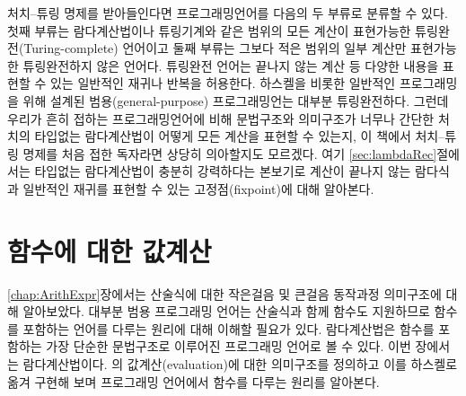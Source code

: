 처치--튜링 명제를 받아들인다면 프로그래밍언어를 다음의 두 부류로 분류할 수 있다.
첫째 부류는 람다계산법이나 튜링기계와 같은 범위의 모든 계산이 표현가능한 
튜링완전(Turing-complete) 언어이고 둘째 부류는 그보다 적은 범위의 일부 계산만
표현가능한 튜링완전하지 않은 언어다. 튜링완전 언어는 끝나지 않는 계산 등
다양한 내용을 표현할 수 있는 일반적인 재귀나 반복을 허용한다. 하스켈을 비롯한
일반적인 프로그래밍을 위해 설계된 범용(general-purpose) 프로그래밍언는 대부분
튜링완전하다. 그런데 우리가 흔히 접하는 프로그래밍언어에 비해 문법구조와
의미구조가 너무나 간단한 처치의 타입없는 람다계산법이 어떻게 모든 계산을
표현할 수 있는지, 이 책에서 처치--튜링 명제를 처음 접한 독자라면 상당히
의아할지도 모르겠다. 여기 \ref{sec:lambdaRec}절에서는 타입없는 람다계산법이 충분히 강력하다는
본보기로 계산이 끝나지 않는 람다식과 일반적인 재귀를 표현할 수 있는
고정점(fixpoint)에 대해 알아본다.




\chapter{함수에 대한 값계산}
\label{chap:FunEval}
\ref{chap:ArithExpr}장에서는 산술식에 대한 작은걸음 및 큰걸음
동작과정 의미구조에 대해 알아보았다. 대부분 범용 프로그래밍 언어는
산술식과 함께 함수도 지원하므로 함수를 포함하는 언어를
다루는 원리에 대해 이해할 필요가 있다. 람다계산법은 함수를 포함하는
가장 단순한 문법구조로 이루어진 프로그래밍 언어로 볼 수 있다. 
이번 장에서는 람다계산법이다. 의 값계산(evaluation)에
대한 의미구조를 정의하고 이를 하스켈로 옮겨 구현해 보며
프로그래밍 언어에서 함수를 다루는 원리를 알아본다.
\newpage

